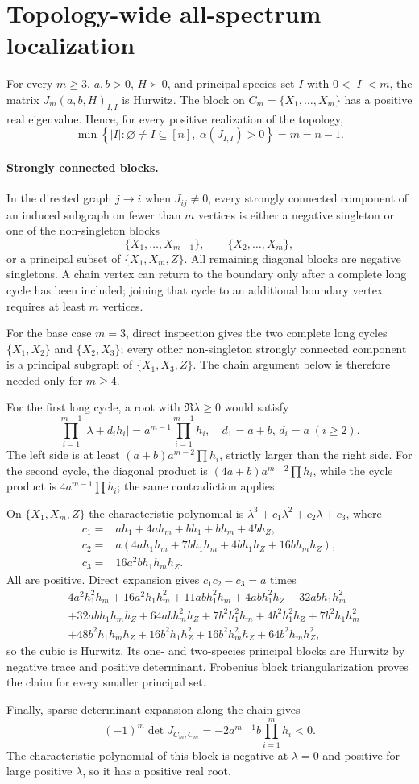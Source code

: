 \section*{Topology-wide all-spectrum localization}
\begin{theorem}
For every $m\geq3$, $a,b>0$, $H\succ0$, and principal species set $I$ with
$0<|I|<m$, the matrix $J_m(a,b,H)_{I,I}$ is Hurwitz.  The block on
$C_m=\{X_1,\ldots,X_m\}$ has a positive real eigenvalue.  Hence, for every
positive realization of the topology,
\[
\min\left\{|I|:\varnothing\ne I\subseteq[n],\
\alpha(J_{I,I})>0\right\}=m=n-1.
\]
\end{theorem}

\paragraph{Strongly connected blocks.}
In the directed graph $j\to i$ when $J_{ij}\neq0$, every strongly connected
component of an induced subgraph on fewer than $m$ vertices is either a
negative singleton or one of the non-singleton blocks
\[
\{X_1,\ldots,X_{m-1}\},\qquad
\{X_2,\ldots,X_m\},
\]
or a principal subset of $\{X_1,X_m,Z\}$.  All remaining diagonal blocks are
negative singletons.  A chain vertex can return to the boundary only after a
complete long cycle has been included; joining that cycle to an additional
boundary vertex requires at least $m$ vertices.

For the base case $m=3$, direct inspection gives the two complete long cycles
$\{X_1,X_2\}$ and $\{X_2,X_3\}$; every other non-singleton strongly connected
component is a principal subgraph of $\{X_1,X_3,Z\}$.  The chain argument
below is therefore needed only for $m\ge4$.

For the first long cycle, a root with $\Re\lambda\geq0$ would satisfy
\[
\prod_{i=1}^{m-1}|\lambda+d_i h_i|
 =a^{m-1}\prod_{i=1}^{m-1}h_i,
\quad d_1=a+b,\,d_i=a\;(i\ge2).
\]
The left side is at least $(a+b)a^{m-2}\prod h_i$, strictly larger than the
right side.  For the second cycle, the diagonal product is
$(4a+b)a^{m-2}\prod h_i$, while the cycle product is
$4a^{m-1}\prod h_i$; the same contradiction applies.

On $\{X_1,X_m,Z\}$ the characteristic polynomial is
$\lambda^3+c_1\lambda^2+c_2\lambda+c_3$, where
\begin{align*}
c_1={}&ah_1+4ah_m+bh_1+bh_m+4bh_Z,\\
c_2={}&a(4ah_1h_m+7bh_1h_m+4bh_1h_Z+16bh_mh_Z),\\
c_3={}&16a^2bh_1h_mh_Z.
\end{align*}
All are positive.  Direct expansion gives $c_1c_2-c_3=a$ times
\begin{align*}
&4a^2h_1^2h_m+16a^2h_1h_m^2+11abh_1^2h_m+4abh_1^2h_Z
+32abh_1h_m^2\\
&+32abh_1h_mh_Z+64abh_m^2h_Z+7b^2h_1^2h_m+4b^2h_1^2h_Z
+7b^2h_1h_m^2\\
&+48b^2h_1h_mh_Z+16b^2h_1h_Z^2+16b^2h_m^2h_Z
+64b^2h_mh_Z^2,
\end{align*}
so the cubic is Hurwitz.  Its one- and two-species principal blocks are
Hurwitz by negative trace and positive determinant.  Frobenius block
triangularization proves the claim for every smaller principal set.

Finally, sparse determinant expansion along the chain gives
\[
(-1)^m\det J_{C_m,C_m}
=-2a^{m-1}b\prod_{i=1}^m h_i<0.
\]
The characteristic polynomial of this block is negative at $\lambda=0$ and
positive for large positive $\lambda$, so it has a positive real root.
